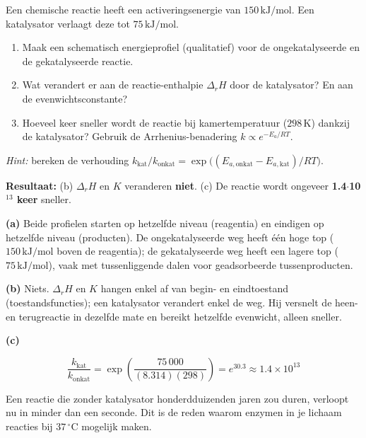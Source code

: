 \begin{oefening}\label{oef:h2-5}
Een chemische reactie heeft een activeringsenergie van \(150\,\mathrm{kJ/mol}\). Een katalysator verlaagt deze tot \(75\,\mathrm{kJ/mol}\).

\begin{enumerate}
\item[(a)]
  Maak een schematisch energieprofiel (qualitatief) voor de ongekatalyseerde en de gekatalyseerde reactie.
\item[(b)]
  Wat verandert er aan de reactie-enthalpie \(\Delta_r H\) door de katalysator? En aan de evenwichtsconstante?
\item[(c)]
  Hoeveel keer sneller wordt de reactie bij kamertemperatuur (\(298\,\mathrm{K}\)) dankzij de katalysator? Gebruik de Arrhenius-benadering \(k \propto e^{-E_a/RT}\).
\end{enumerate}

\emph{Hint:} bereken de verhouding \(k_{\text{kat}}/k_{\text{onkat}} = \exp\!\bigl((E_{a,\text{onkat}} - E_{a,\text{kat}})/RT\bigr)\).
\end{oefening}
\begin{oplossing}
\textbf{Resultaat:} (b) \(\Delta_r H\) en \(K\) veranderen \textbf{niet}. (c) De reactie wordt ongeveer \textbf{1.4\ensuremath{\cdot{}}10\ensuremath{^{13}} keer} sneller.

\textbf{(a)} Beide profielen starten op hetzelfde niveau (reagentia) en eindigen op hetzelfde niveau (producten). De ongekatalyseerde weg heeft één hoge top (\(150\,\mathrm{kJ/mol}\) boven de reagentia); de gekatalyseerde weg heeft een lagere top (\(75\,\mathrm{kJ/mol}\)), vaak met tussenliggende dalen voor geadsorbeerde tussenproducten.

\textbf{(b)} Niets. \(\Delta_r H\) en \(K\) hangen enkel af van begin- en eindtoestand (toestandsfuncties); een katalysator verandert enkel de weg. Hij versnelt de heen- en terugreactie in dezelfde mate en bereikt hetzelfde evenwicht, alleen sneller.

\textbf{(c)}

\[
\frac{k_{\text{kat}}}{k_{\text{onkat}}} = \exp\!\left(\frac{75\,000}{(8.314)(298)}\right) = e^{30.3} \approx 1.4\times10^{13}
\]

Een reactie die zonder katalysator honderdduizenden jaren zou duren, verloopt nu in minder dan een seconde. Dit is de reden waarom enzymen in je lichaam reacties bij \(37\,^\circ\mathrm{C}\) mogelijk maken.
\end{oplossing}

